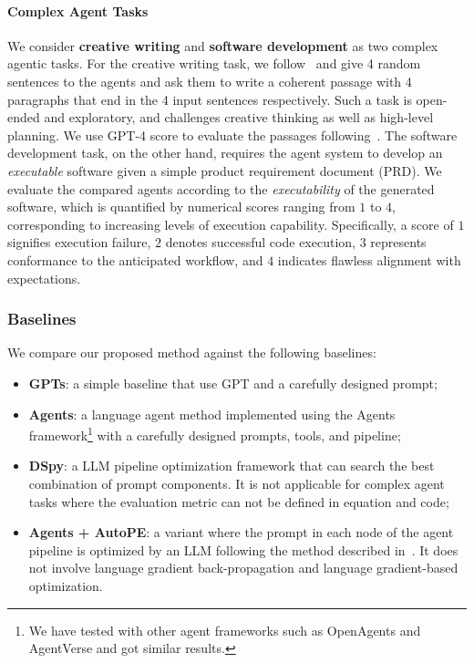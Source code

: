 \documentclass{article}
\begin{document}
\paragraph{Complex Agent Tasks}
We consider \textbf{creative writing} and \textbf{software development} as two complex agentic tasks. For the creative writing task, we follow~\citet{yao2023tree} and give 4 random sentences to the agents and ask them to write a coherent passage with 4 paragraphs that end in the 4 input sentences respectively. Such a task is
open-ended and exploratory, and challenges creative thinking as well as high-level planning. We use GPT-4 score to evaluate the passages following~\citep{yao2023tree}. The software development task, on the other hand, requires the agent system to develop an \textit{executable} software given a simple product requirement document (PRD). We evaluate the compared agents according to the \textit{executability} of the generated software, which is quantified by numerical scores ranging from $1$ to $4$, corresponding to increasing levels of execution capability. Specifically, a score of $1$ signifies execution failure, $2$ denotes successful code execution, $3$ represents conformance to the anticipated workflow, and $4$ indicates flawless alignment with expectations.




















\subsubsection{Baselines}

We compare our proposed method against the following baselines:
\begin{itemize}
    \item \textbf{GPTs}: a simple baseline that use GPT and a carefully designed prompt; 
    \item \textbf{Agents}: a language agent method implemented using the Agents~\citep{zhou2023agents} framework\footnote{We have tested with other agent frameworks such as OpenAgents and AgentVerse and got similar results.} with a carefully designed prompts, tools, and pipeline;
    \item \textbf{DSpy}: a LLM pipeline optimization framework that can search the best combination of prompt components. It is not applicable for complex agent tasks where the evaluation metric can not be defined in equation and code;
    \item  \textbf{Agents + AutoPE}: a variant where the prompt in each node of the agent pipeline is optimized by an LLM following the method described in~\citet{yang2024large}. It does not involve language gradient back-propagation and language gradient-based optimization.
\end{itemize}
\end{document}
